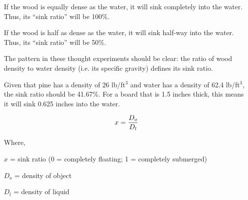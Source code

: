 \vskip 10pt

If the wood is equally dense as the water, it will sink completely into the water.  Thus, its ``sink ratio'' will be 100\%.

\vskip 10pt

If the wood is half as dense as the water, it will sink half-way into the water.  Thus, its ``sink ratio'' will be 50\%.

\vskip 10pt

The pattern in these thought experiments should be clear: the ratio of wood density to water density (i.e. its specific gravity) defines its sink ratio.

\vskip 10pt

Given that pine has a density of 26 lb/ft$^{3}$ and water has a density of 62.4 lb/ft$^{3}$, the sink ratio should be 41.67\%.  For a board that is 1.5 inches thick, this means it will sink 0.625 inches into the water.

\vskip 20pt

$$x = {D_o \over D_l}$$

\noindent
Where,

$x$ = sink ratio (0 = completely floating; 1 = completely submerged)

$D_o$ = density of object

$D_l$ = density of liquid




